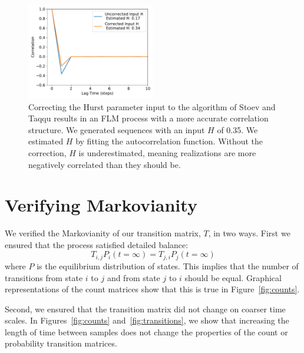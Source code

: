 \documentclass{article}
\begin{document}
  \begin{figure}
  \centering
  \includegraphics[width=0.5\textwidth]{hurst_correction.pdf}
  \caption{Correcting the Hurst parameter input to the algorithm of Stoev and Taqqu
  results in an FLM process with a more accurate correlation structure. We generated
  sequences with an input $H$ of 0.35. We estimated $H$ by fitting the autocorrelation
  function. Without the correction, $H$ is underestimated, meaning realizations are 
  more negatively correlated than they should be.}\label{fig:hurst_correction}
  \end{figure}
  
  \section{Verifying Markovianity}\label{section:markov_validation}
  
  We verified the Markovianity of our transition matrix, $T$, in two ways. First we 
  ensured that the process satisfied detailed balance:
  \begin{equation}
  T_{i,j}P_i(t=\infty) = T_{j,i}P_j(t=\infty)
  \end{equation}
  where $P$ is the equilibrium distribution of states. This implies that the number
  of transitions from state $i$ to $j$ and from state $j$ to $i$ should be equal. Graphical 
  representations of the count matrices show that this is true in Figure~\ref{fig:counts}. 
  
  Second, we ensured that the transition matrix did not change on coarser time scales.
  In Figures~\ref{fig:counts} and~\ref{fig:transitions}, we show that increasing the 
  length of time between samples does not change the properties of the count or
  probability transition matrices.
  
\end{document}
